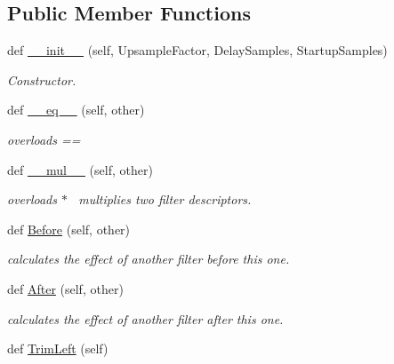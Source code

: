 \subsection*{Public Member Functions}
\begin{DoxyCompactItemize}
\item 
def \hyperlink{classSignalIntegrity_1_1TimeDomain_1_1Filters_1_1FilterDescriptor_1_1FilterDescriptor_a5661d52c9fb7ff469d450299f14df811}{\+\_\+\+\_\+init\+\_\+\+\_\+} (self, Upsample\+Factor, Delay\+Samples, Startup\+Samples)
\begin{DoxyCompactList}\small\item\em Constructor. \end{DoxyCompactList}\item 
def \hyperlink{classSignalIntegrity_1_1TimeDomain_1_1Filters_1_1FilterDescriptor_1_1FilterDescriptor_ad794ff077f2f05f228a7109f3670ac40}{\+\_\+\+\_\+eq\+\_\+\+\_\+} (self, other)
\begin{DoxyCompactList}\small\item\em overloads == \end{DoxyCompactList}\item 
def \hyperlink{classSignalIntegrity_1_1TimeDomain_1_1Filters_1_1FilterDescriptor_1_1FilterDescriptor_a96fd98a8997501189d60829abc0257cb}{\+\_\+\+\_\+mul\+\_\+\+\_\+} (self, other)
\begin{DoxyCompactList}\small\item\em overloads $\ast$~\newline
 multiplies two filter descriptors. \end{DoxyCompactList}\item 
def \hyperlink{classSignalIntegrity_1_1TimeDomain_1_1Filters_1_1FilterDescriptor_1_1FilterDescriptor_ae1c78203caa83b9eb7ecb92152f3488f}{Before} (self, other)
\begin{DoxyCompactList}\small\item\em calculates the effect of another filter before this one. \end{DoxyCompactList}\item 
def \hyperlink{classSignalIntegrity_1_1TimeDomain_1_1Filters_1_1FilterDescriptor_1_1FilterDescriptor_a29cf65c495a760f61e56af7b64342109}{After} (self, other)
\begin{DoxyCompactList}\small\item\em calculates the effect of another filter after this one. \end{DoxyCompactList}\item 
def \hyperlink{classSignalIntegrity_1_1TimeDomain_1_1Filters_1_1FilterDescriptor_1_1FilterDescriptor_aa755b1fade9a131f66c5a448181a158e}{Trim\+Left} (self)

\end{DoxyCompactItemize}
